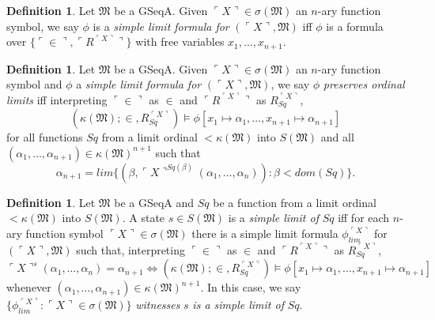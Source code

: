 \documentclass[12pt, twoside]{memoir}
\numberwithin{equation}{section}
\theoremstyle{definition}
\newtheorem{defi}[thm]{Definition}
\theoremstyle{remark}
\theoremstyle{definition}
\theoremstyle{definition}
\theoremstyle{definition}
\theoremstyle{remark}
\begin{document}
\begin{defi}
Let $\mathfrak{M}$ be a GSeqA. Given $\ulcorner X \urcorner \in \sigma(\mathfrak{M})$ an $n$-ary function symbol, we say $\phi$ is a \emph{simple limit formula for} $(\ulcorner X \urcorner, \mathfrak{M})$ iff $\phi$ is a formula over $\{\ulcorner \in \urcorner, \ulcorner R^{\ulcorner X \urcorner} \urcorner\}$ with free variables $x_1, \dots, x_{n+1}$.
\end{defi}

\begin{defi}\label{def234c}
Let $\mathfrak{M}$ be a GSeqA. Given $\ulcorner X \urcorner \in \sigma(\mathfrak{M})$ an $n$-ary function symbol and $\phi$ a \emph{simple limit formula for} $(\ulcorner X \urcorner, \mathfrak{M})$, we say $\phi$ \emph{preserves ordinal limits} iff interpreting $\ulcorner \in \urcorner$ as $\in$ and $\ulcorner R^{\ulcorner X \urcorner} \urcorner$ as $R_{Sq}^{\ulcorner X \urcorner}$, 
\begin{equation*}
    (\kappa(\mathfrak{M}); \in, R_{Sq}^{\ulcorner X \urcorner}) \models \phi[x_1 \mapsto \alpha_1, \dots, x_{n+1} \mapsto \alpha_{n+1}]
\end{equation*}
for all functions $Sq$ from a limit ordinal $< \kappa(\mathfrak{M})$ into $S(\mathfrak{M})$ and all $(\alpha_1, \dots, \alpha_{n+1}) \in \kappa(\mathfrak{M})^{n+1}$ such that 
\begin{equation*}
    \alpha_{n+1} = lim \{(\beta, \ulcorner X \urcorner^{Sq(\beta)}(\alpha_1, \dots, \alpha_n)) : \beta < dom(Sq)\} \text{.}
\end{equation*}
\end{defi}

\begin{defi}\label{def234}
Let $\mathfrak{M}$ be a GSeqA and $Sq$ be a function from a limit ordinal $< \kappa(\mathfrak{M})$ into $S(\mathfrak{M})$. A state $s \in S(\mathfrak{M})$ is a \emph{simple limit of} $Sq$ iff for each $n$-ary function symbol $\ulcorner X \urcorner \in \sigma(\mathfrak{M})$ there is a simple limit formula $\phi_{lim}^{\ulcorner X \urcorner}$ for $(\ulcorner X \urcorner, \mathfrak{M})$ such that, interpreting $\ulcorner \in \urcorner$ as $\in$ and $\ulcorner R^{\ulcorner X \urcorner} \urcorner$ as $R_{Sq}^{\ulcorner X \urcorner}$, 
\begin{equation*}
    \ulcorner X \urcorner^s (\alpha_1, \dots, \alpha_n) = \alpha_{n+1} \iff (\kappa(\mathfrak{M}); \in, R_{Sq}^{\ulcorner X \urcorner}) \models \phi[x_1 \mapsto \alpha_1, \dots, x_{n+1} \mapsto \alpha_{n+1}]
\end{equation*}
whenever $(\alpha_1, \dots, \alpha_{n+1}) \in \kappa(\mathfrak{M})^{n+1}$. In this case, we say $\{\phi_{lim}^{\ulcorner X \urcorner} : \ulcorner X \urcorner \in \sigma(\mathfrak{M})\}$ \emph{witnesses} $s$ \emph{is a simple limit of} $Sq$.
\end{defi}
\end{document}

